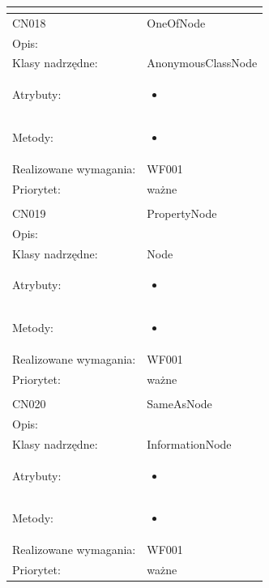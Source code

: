 \documentclass[a4paper,10pt]{article}
\begin{document}
\begin{center}
\begin{longtable}{|m{3cm}|m{9cm}|}
\multicolumn{2}{c}{} \\
 \hline

CN018 & OneOfNode \\ \hline
Opis: &     \\ \hline
Klasy nadrzędne: & AnonymousClassNode     \\ \hline
Atrybuty: & \begin{itemize}
 \item 
\end{itemize}
 \\ \hline
Metody: & \begin{itemize}
 \item 
\end{itemize}
  \\ \hline
Realizowane wymagania: & WF001 \\ \hline
Priorytet: & ważne  \\ \hline

\multicolumn{2}{c}{} \\
 \hline

CN019 & PropertyNode \\ \hline
Opis: &     \\ \hline
Klasy nadrzędne: & Node     \\ \hline
Atrybuty: & \begin{itemize}
 \item 
\end{itemize}
 \\ \hline
Metody: & \begin{itemize}
 \item 
\end{itemize}
  \\ \hline
Realizowane wymagania: & WF001 \\ \hline
Priorytet: & ważne  \\ \hline

\multicolumn{2}{c}{} \\
 \hline

CN020 & SameAsNode \\ \hline
Opis: &     \\ \hline
Klasy nadrzędne: & InformationNode     \\ \hline
Atrybuty: & \begin{itemize}
 \item 
\end{itemize}
 \\ \hline
Metody: & \begin{itemize}
 \item 
\end{itemize}
  \\ \hline
Realizowane wymagania: & WF001 \\ \hline
Priorytet: & ważne  \\ \hline


\end{longtable}
\end{center}
\end{document}
